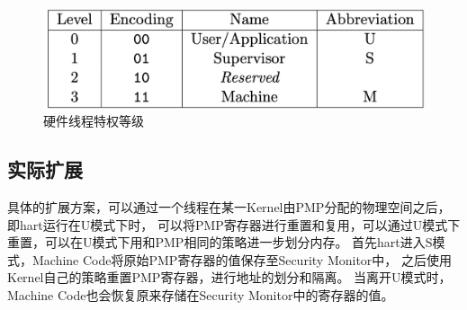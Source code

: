 \begin{figure}
    \centering
    \includegraphics[scale=0.30]{Figures/extend/level.png}
    \decoRule
    \caption{硬件线程特权等级}
    \label{fig:level}
\end{figure}

\subsection{实际扩展}
具体的扩展方案，可以通过一个线程在某一Kernel由PMP分配的物理空间之后，即hart运行在U模式下时，
可以将PMP寄存器进行重置和复用，可以通过U模式下重置，可以在U模式下用和PMP相同的策略进一步划分内存。
首先hart进入S模式\cite{keystone-p4}，Machine Code将原始PMP寄存器的值保存至Security Monitor中，
之后使用Kernel自己的策略重置PMP寄存器，进行地址的划分和隔离。
当离开U模式时，Machine Code也会恢复原来存储在Security Monitor中的寄存器的值。



